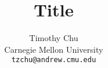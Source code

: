 


\title{Title}
\author{
  Timothy Chu \\
  Carnegie Mellon University\\
  \texttt{tzchu@andrew.cmu.edu}
}

\setcounter{page}{0}
\maketitle
\thispagestyle{empty}
\begin{abstract}

\end{abstract}

\clearpage


\begin{appendix}
\end{appendix}

